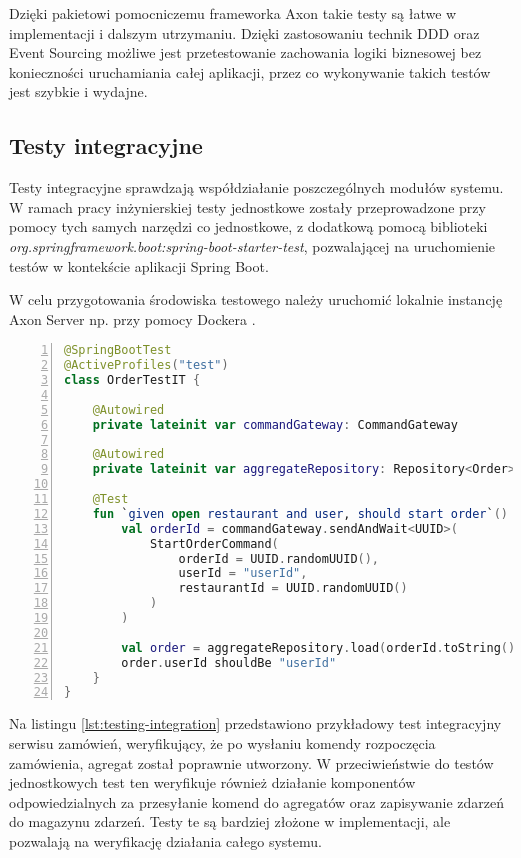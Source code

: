 Dzięki pakietowi pomocniczemu frameworka Axon takie testy są łatwe w implementacji i dalszym utrzymaniu. Dzięki zastosowaniu technik DDD oraz Event Sourcing możliwe jest przetestowanie zachowania logiki biznesowej bez konieczności uruchamiania całej aplikacji, przez co wykonywanie takich testów jest szybkie i wydajne.

\subsection{Testy integracyjne}

Testy integracyjne sprawdzają współdziałanie poszczególnych modułów systemu. W ramach pracy inżynierskiej testy jednostkowe zostały przeprowadzone przy pomocy tych samych narzędzi co jednostkowe, z dodatkową pomocą biblioteki \linebreak \textit{org.springframework.boot:spring-boot-starter-test}, pozwalającej na uruchomienie testów w kontekście aplikacji Spring Boot.

W celu przygotowania środowiska testowego należy uruchomić lokalnie instancję Axon Server np. przy pomocy Dockera \cite{docker}.

\begin{lstlisting}[caption={Przykładowy test integracyjny serwisu zamówień},label={lst:testing-integration},captionpos=b,language=Kotlin,numbers=left]
@SpringBootTest
@ActiveProfiles("test")
class OrderTestIT {

    @Autowired
    private lateinit var commandGateway: CommandGateway

    @Autowired
    private lateinit var aggregateRepository: Repository<Order>

    @Test
    fun `given open restaurant and user, should start order`() {
        val orderId = commandGateway.sendAndWait<UUID>(
            StartOrderCommand(
                orderId = UUID.randomUUID(),
                userId = "userId",
                restaurantId = UUID.randomUUID()
            )
        )

        val order = aggregateRepository.load(orderId.toString())
        order.userId shouldBe "userId"
    }
}
\end{lstlisting}

Na listingu \ref{lst:testing-integration} przedstawiono przykładowy test integracyjny serwisu zamówień, weryfikujący, że po wysłaniu komendy rozpoczęcia zamówienia, agregat został poprawnie utworzony. W przeciwieństwie do testów jednostkowych test ten weryfikuje również działanie komponentów odpowiedzialnych za przesyłanie komend do agregatów oraz zapisywanie zdarzeń do magazynu zdarzeń. Testy te są bardziej złożone w implementacji, ale pozwalają na weryfikację działania całego systemu.

